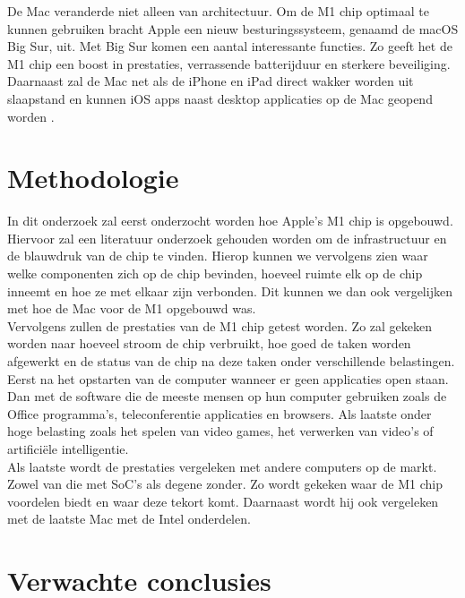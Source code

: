 \documentclass{hogent-article}
\begin{document}
De Mac veranderde niet alleen van architectuur. Om de M1 chip optimaal te kunnen gebruiken bracht Apple een nieuw besturingssysteem, genaamd de macOS Big Sur, uit. Met Big Sur komen een aantal interessante functies. Zo geeft het de M1 chip een boost in prestaties, verrassende batterijduur en sterkere beveiliging. Daarnaast zal de Mac net als de iPhone en iPad direct wakker worden uit slaapstand en kunnen iOS apps naast desktop applicaties op de Mac geopend worden \autocite{Apple2020}.

\section{Methodologie}


In dit onderzoek zal eerst onderzocht worden hoe Apple's M1 chip is opgebouwd. Hiervoor zal een literatuur onderzoek gehouden worden om de infrastructuur en de blauwdruk van de chip te vinden. Hierop kunnen we vervolgens zien waar welke componenten zich op de chip bevinden, hoeveel ruimte elk op de chip inneemt en hoe ze met elkaar zijn verbonden. Dit kunnen we dan ook vergelijken met hoe de Mac voor de M1 opgebouwd was. \\
Vervolgens zullen de prestaties van de M1 chip getest worden. Zo zal gekeken worden naar hoeveel stroom de chip verbruikt, hoe goed de taken worden afgewerkt en de status van de chip na deze taken onder verschillende belastingen. Eerst na het opstarten van de computer wanneer er geen applicaties open staan. Dan met de software die de meeste mensen op hun computer gebruiken zoals de Office programma's,  teleconferentie applicaties en browsers. Als laatste onder hoge belasting zoals het spelen van video games, het verwerken van video's of artificiële intelligentie. \\
Als laatste wordt de prestaties vergeleken met andere computers op de markt. Zowel van die met SoC's als degene zonder. Zo wordt gekeken waar de M1 chip voordelen biedt en waar deze tekort komt. Daarnaast wordt hij ook vergeleken met de laatste Mac met de Intel onderdelen.

\section{Verwachte conclusies}
\end{document}
